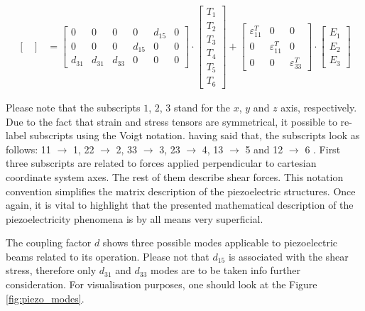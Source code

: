 \documentclass[12pt,a4paper]{article}
\begin{document}
\begin{equation}
\begin{aligned}
\begin{bmatrix}
\end{bmatrix}
&=
\begin{bmatrix}
0 & 0 & 0 & 0 & d_{15} & 0\\ 
0 & 0 & 0 & d_{15} & 0 & 0\\ 
d_{31} & d_{31} & d_{33} & 0 & 0 & 0
\end{bmatrix}
\cdot
\begin{bmatrix}
T_{1}\\ 
T_{2}\\ 
T_{3}\\ 
T_{4}\\ 
T_{5}\\
T_{6} 
\end{bmatrix}
+
\begin{bmatrix}
\varepsilon_{11}^T & 0 & 0\\ 
0 & \varepsilon_{11}^T & 0\\ 
0 & 0 & \varepsilon_{33}^T
\end{bmatrix}
\cdot
\begin{bmatrix}
E_1\\ 
E_2\\ 
E_3
\end{bmatrix}
    \label{eq:pztmatrix}
\end{aligned}
\end{equation}

Please note that the subscripts $1$, $2$, $3$ stand for the $x$, $y$ and $z$ axis, respectively. Due to the fact that strain and stress tensors are symmetrical, it possible to re-label subscripts using the Voigt notation. having said that, the subscripts look as follows: 11 $\rightarrow$ 1, 22 $\rightarrow$ 2, 33 $\rightarrow$ 3, 23 $\rightarrow$ 4, 13 $\rightarrow$ 5 and 12 $\rightarrow$ 6  \cite{cmos}. First three subscripts are related to forces applied perpendicular to cartesian coordinate system axes. The rest of them describe shear forces. This notation convention simplifies the matrix description of the piezoelectric structures. Once again, it is vital to highlight that the presented mathematical description of the piezoelectricity phenomena is by all means very superficial. 
\par

The coupling factor $d$ shows three possible modes applicable to piezoelectric beams related to its operation. Please not that $d_{15}$ is associated with the shear stress, therefore only $d_{31}$ and $d_{33}$ modes are to be taken info further consideration. For visualisation purposes, one should look at the Figure \ref{fig:piezo_modes}.
\par
\end{document}
